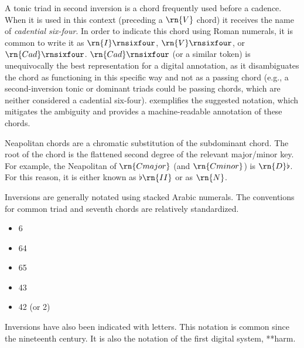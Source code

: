 A tonic triad in second inversion is a chord frequently used
before a cadence. When it is used in this context (preceding
a $\rn{V}$ chord) it receives the name of \emph{cadential
six-four}. In order to indicate this chord using Roman
numerals, it is common to write it as $\rn{I}\rnsixfour$,
$\rn{V}\rnsixfour$, or $\rn{Cad}\rnsixfour$.
$\rn{Cad}\rnsixfour$ (or a similar token) is unequivocally
the best representation for a digital annotation, as it
disambiguates the chord as functioning in this specific way
and not as a passing chord (e.g., a second-inversion tonic
or dominant triads could be passing chords, which are
neither considered a cadential six-four).
 exemplifies the suggested
notation, which mitigates the ambiguity and provides a
machine-readable annotation of these chords.

Neapolitan chords are a chromatic substitution of the
subdominant chord. The root of the chord is the flattened
second degree of the relevant major/minor key. For example,
the Neapolitan of $\rn{C major}$ (and $\rn{C minor}$) is
$\rn{D}\flat$. For this reason, it is either known as
$\flat\rn{II}$ or as $\rn{N}$.

Inversions are generally notated using stacked Arabic
numerals. The conventions for common triad and seventh
chords are relatively standardized.

\begin{itemize}
    \item 6
    \item 64
    \item 65
    \item 43
    \item 42 (or 2)
\end{itemize}

Inversions have also been indicated with letters. This
notation is common since the nineteenth century. It is also
the notation of the first digital system, **harm.

